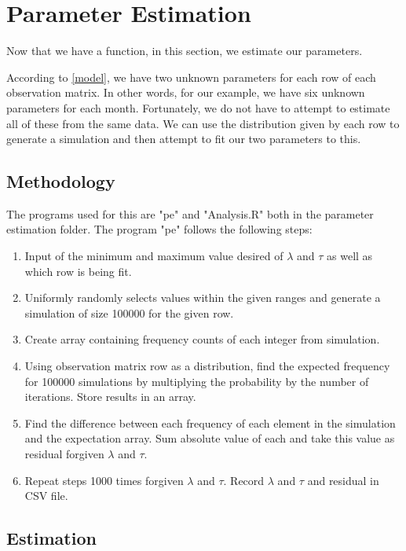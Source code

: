 \section{Parameter Estimation}
\label{Generalising_the_Observation_Matrix:Parameter_Estimation}

Now that we have a function, in this section, we estimate our parameters.

According to \ref{model}, we have two unknown parameters for each row of each observation matrix. In other words, for our example, we have six unknown parameters for each month. Fortunately, we do not have to attempt to estimate all of these from the same data. We can use the distribution given by each row to generate a simulation and then attempt to fit our two parameters to this.


    \subsection{Methodology}
    \label{Generalising_the_Observation_Matrix:Parameter_Estimation:Methodology}

    The programs used for this are "pe" and "Analysis.R" both in the parameter estimation folder. The program "pe" follows the following steps:
    \begin{enumerate}
        \item Input of the minimum and maximum value desired of $\lambda$ and $\tau$ as well as which row is being fit.
        \item Uniformly randomly selects values within the given ranges and generate a simulation of size 100000 for the given row.
        \item Create array containing frequency counts of each integer from simulation.
        \item Using observation matrix row as a distribution, find the expected frequency for 100000 simulations by multiplying the probability by the number of iterations. Store results in an array.
        \item Find the difference between each frequency of each element in the simulation and the expectation array. Sum absolute value of each and take this value as residual forgiven $\lambda$ and $\tau$. 
        \item Repeat steps 1000 times forgiven $\lambda$ and $\tau$. Record $\lambda$ and $\tau$ and residual in CSV file. 
    \end{enumerate}

    \subsection{Estimation}
    \label{Generalising_the_Observation_Matrix:Parameter_Estimation:Estimation}

